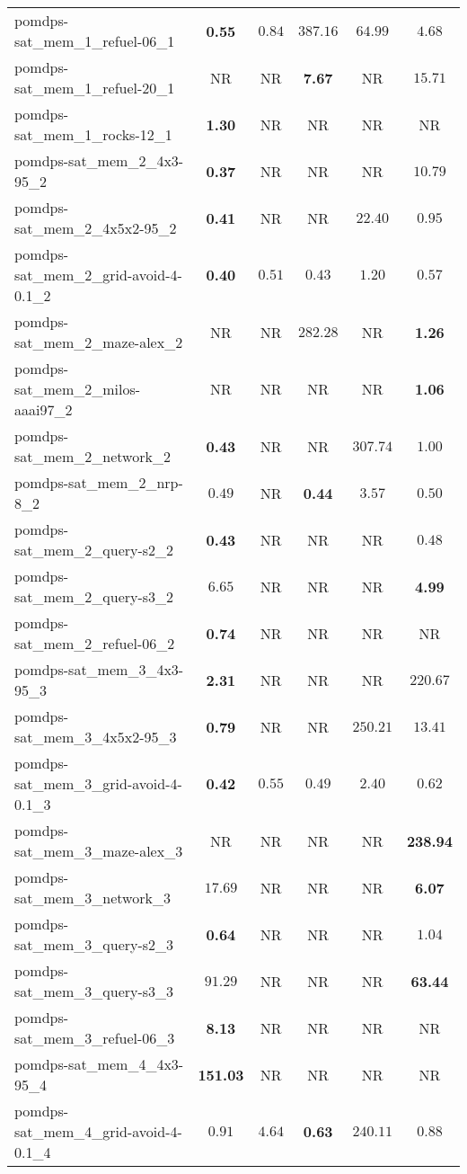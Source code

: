 \begin{tabular}{lccccc}
pomdps-sat\_mem\_1\_refuel-06\_1 & \textbf{0.55} & $0.84$ & $387.16$ & $64.99$ & $4.68$ \\
pomdps-sat\_mem\_1\_refuel-20\_1 & NR & NR & \textbf{7.67} & NR & $15.71$ \\
pomdps-sat\_mem\_1\_rocks-12\_1 & \textbf{1.30} & NR & NR & NR & NR \\
pomdps-sat\_mem\_2\_4x3-95\_2 & \textbf{0.37} & NR & NR & NR & $10.79$ \\
pomdps-sat\_mem\_2\_4x5x2-95\_2 & \textbf{0.41} & NR & NR & $22.40$ & $0.95$ \\
pomdps-sat\_mem\_2\_grid-avoid-4-0.1\_2 & \textbf{0.40} & $0.51$ & $0.43$ & $1.20$ & $0.57$ \\
pomdps-sat\_mem\_2\_maze-alex\_2 & NR & NR & $282.28$ & NR & \textbf{1.26} \\
pomdps-sat\_mem\_2\_milos-aaai97\_2 & NR & NR & NR & NR & \textbf{1.06} \\
pomdps-sat\_mem\_2\_network\_2 & \textbf{0.43} & NR & NR & $307.74$ & $1.00$ \\
pomdps-sat\_mem\_2\_nrp-8\_2 & $0.49$ & NR & \textbf{0.44} & $3.57$ & $0.50$ \\
pomdps-sat\_mem\_2\_query-s2\_2 & \textbf{0.43} & NR & NR & NR & $0.48$ \\
pomdps-sat\_mem\_2\_query-s3\_2 & $6.65$ & NR & NR & NR & \textbf{4.99} \\
pomdps-sat\_mem\_2\_refuel-06\_2 & \textbf{0.74} & NR & NR & NR & NR \\
pomdps-sat\_mem\_3\_4x3-95\_3 & \textbf{2.31} & NR & NR & NR & $220.67$ \\
pomdps-sat\_mem\_3\_4x5x2-95\_3 & \textbf{0.79} & NR & NR & $250.21$ & $13.41$ \\
pomdps-sat\_mem\_3\_grid-avoid-4-0.1\_3 & \textbf{0.42} & $0.55$ & $0.49$ & $2.40$ & $0.62$ \\
pomdps-sat\_mem\_3\_maze-alex\_3 & NR & NR & NR & NR & \textbf{238.94} \\
pomdps-sat\_mem\_3\_network\_3 & $17.69$ & NR & NR & NR & \textbf{6.07} \\
pomdps-sat\_mem\_3\_query-s2\_3 & \textbf{0.64} & NR & NR & NR & $1.04$ \\
pomdps-sat\_mem\_3\_query-s3\_3 & $91.29$ & NR & NR & NR & \textbf{63.44} \\
pomdps-sat\_mem\_3\_refuel-06\_3 & \textbf{8.13} & NR & NR & NR & NR \\
pomdps-sat\_mem\_4\_4x3-95\_4 & \textbf{151.03} & NR & NR & NR & NR \\
pomdps-sat\_mem\_4\_grid-avoid-4-0.1\_4 & $0.91$ & $4.64$ & \textbf{0.63} & $240.11$ & $0.88$ \\

\end{tabular}
